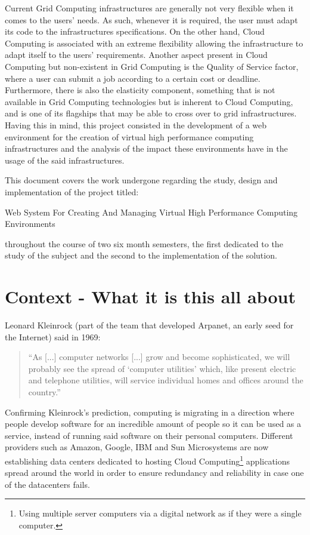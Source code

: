 Current Grid Computing infrastructures are generally not very flexible when it comes to the users' needs. As such, whenever it is required, the user must adapt its code to the infrastructures specifications.
On the other hand, Cloud Computing is associated with an extreme flexibility allowing the infrastructure to adapt itself to the users' requirements. Another aspect present in Cloud Computing but non-existent in Grid Computing is the Quality of Service factor, where a user can submit a job according to a certain cost or deadline.
Furthermore, there is also the elasticity component, something that is not available in Grid Computing technologies but is inherent to Cloud Computing, and is one of its flagships that may be able to cross over to grid infrastructures.
Having this in mind, this project consisted in the development of a web environment for the creation of virtual high performance computing infrastructures and the analysis of the impact these environments have in the usage of the said infrastructures.

This document covers the work undergone regarding the study, design and implementation of the project titled:

Web System For Creating And Managing Virtual High Performance Computing Environments

throughout the course of two six month semesters, the first dedicated to the study of the subject and the second to the implementation of the solution.




\section{Context - What it is this all about} \label{}

Leonard Kleinrock (part of the team that developed Arpanet, an early seed for the Internet) said in 1969:

\begin{quote}
  ``As [...] computer networks [...] grow and become sophisticated, we will probably see the spread of `computer utilities' which, like present electric and telephone utilities, will service individual homes and offices around the country.''~\cite{Buyya2009599} 
\end{quote}
	
Confirming Kleinrock's prediction, computing is migrating in a direction where people develop software for an incredible amount of people so it can be used as a service, instead of running said software on their personal computers. Different providers such as Amazon, Google, IBM and Sun Microsystems are now establishing data centers dedicated to hosting Cloud Computing\footnote{Using multiple server computers via a digital network as if they were a single computer.} applications spread around the world in order to ensure redundancy and reliability in case one of the datacenters fails. 

